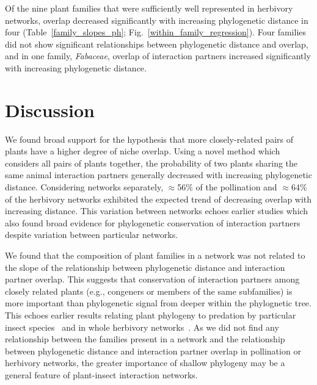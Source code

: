 \documentclass[12pt]{article}
\begin{document}
\begin{spacing}{1.5}
    Of the nine plant families that were sufficiently well represented in herbivory 
    networks, overlap decreased significantly with increasing phylogenetic distance in four 
    (Table~\ref{family_slopes_ph}; Fig.~\ref{within_family_regression}). Four
    families did not show significant relationships between phylogenetic distance and overlap,
    and in one family, \emph{Fabaceae}, overlap of interaction partners increased significantly with 
    increasing phylogenetic distance.


\section*{Discussion} 


  We found broad support for the hypothesis that more
  closely-related pairs of plants have a higher degree
  of niche overlap. Using a novel method which considers
  all pairs of plants together, 
  the probability of two plants sharing the same animal 
  interaction partners generally decreased with increasing 
  phylogenetic distance. Considering networks separately,
  $\approx$56\%  of the pollination and $\approx$64\% of the 
  herbivory networks exhibited the expected trend of decreasing 
  overlap with increasing distance. This variation between networks
  echoes earlier studies \citep[e.g.,][]{Fontaine2015,Hutchinson2017}
  which also found broad evidence for phylogenetic conservation
  of interaction partners despite variation between particular 
  networks. 
 


  We found that the composition of plant families in a network
  was not related to the slope of the relationship between phylogenetic
  distance and interaction partner overlap. This suggests that 
  conservation of interaction partners among closely related plants
  (e.g., congeners or members of the same subfamilies) is more
  important than phylogenetic signal from deeper within the phylognetic
  tree. This echoes earlier results relating plant phylogeny to 
  predation by particular insect species~\citep{Novotny2002,Novotny2004,
  Odegaard2005} and in whole herbivory networks~\citep{Volf2017}. As
  we did not find any relationship between the families present in
  a network and the relationship between phylogenetic distance and
  interaction partner overlap in pollination or herbivory networks,
  the greater importance of shallow phylogeny may be a general 
  feature of plant-insect interaction networks.



\end{spacing}
\end{document}
